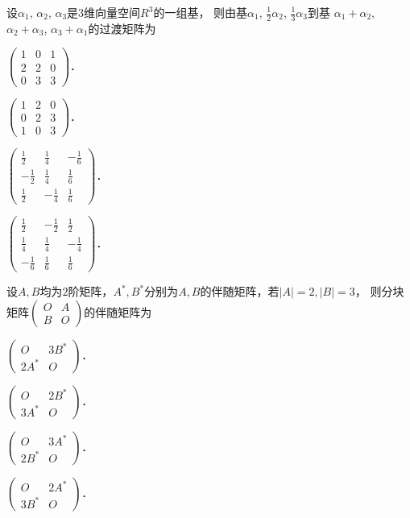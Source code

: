 \documentclass[plain,noanswer,medmath]{../../template/jnuexam}
\begin{document}
\begin{problem}
设$\alpha_1$, $\alpha_2$, $\alpha_3$是$3$维向量空间$R^3$的一组基，
则由基$\alpha_1$, $\frac{1}{2}\alpha_2$, $\frac{1}{3}\alpha_3$到基
$\alpha_1 + \alpha_2$, $\alpha_2 + \alpha_3$, $\alpha_3 + \alpha_1$的过渡矩阵为\pickout{}
\begin{abcd}
\item $\begin{pmatrix}
  1 & 0 & 1 \\
  2 & 2 & 0 \\
  0 & 3 & 3
\end{pmatrix}$．
\item $\begin{pmatrix}
  1 & 2 & 0 \\
  0 & 2 & 3 \\
  1 & 0 & 3
\end{pmatrix}$．
\item $\begin{pmatrix}
   \frac{1}{2} &  \frac{1}{4} & -\frac{1}{6} \\
  -\frac{1}{2} &  \frac{1}{4} & \frac{1}{6} \\
   \frac{1}{2} & -\frac{1}{4} & \frac{1}{6}
\end{pmatrix}$．
\item $\begin{pmatrix}
   \frac{1}{2} & -\frac{1}{2} & \frac{1}{2} \\
   \frac{1}{4} &  \frac{1}{4} & -\frac{1}{4} \\
  -\frac{1}{6} &  \frac{1}{6} & \frac{1}{6}
\end{pmatrix}$．
\end{abcd}
\end{problem}


\begin{problem}
设$A,$$B$均为$2$阶矩阵，$A^*,B^*$分别为$A,$$B$的伴随矩阵，若$|A| = 2,|B| = 3$，
则分块矩阵$\begin{pmatrix}
  O & A \\
  B & O
\end{pmatrix}$的伴随矩阵为\pickout{}
\begin{abcd}
\item $\begin{pmatrix}
     O & 3B^* \\
  2A^* & O
\end{pmatrix}$．
\item $\begin{pmatrix}
     O & 2B^* \\
  3A^* & O
\end{pmatrix}$．
\item $\begin{pmatrix}
     O & 3A^* \\
  2B^* & O
\end{pmatrix}$．
\item $\begin{pmatrix}
     O & 2A^* \\
  3B^* & O
\end{pmatrix}$．
\end{abcd}
\end{problem}
\end{document}

